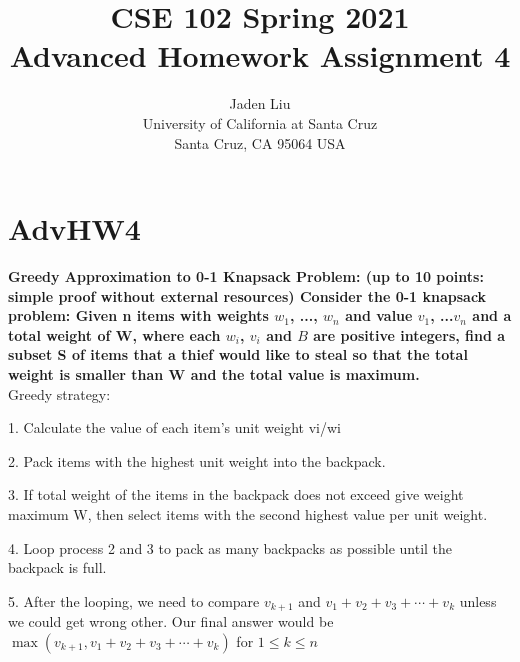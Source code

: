 \documentclass[12pt]{article}
\begin{document}
\title{ CSE 102 Spring 2021\\
	Advanced Homework Assignment 4}

\author{Jaden Liu \\ 
University of California at Santa Cruz\\
Santa Cruz, CA 95064 USA }

\maketitle


\section{AdvHW4} 

\textbf{Greedy Approximation to 0-1 Knapsack Problem: (up to 10 points: simple proof without external
	resources) Consider the 0-1 knapsack problem: Given n items with weights $w_1$, ..., $w_n$ and value $v_1$, ...$v_n$ and a total weight of W, where each $w_i$, $v_i$ and $B$ are positive integers, find a subset S of items that a thief would like to steal so that the total weight is smaller than W and the total value is maximum.}\\
Greedy strategy:

	1. Calculate the value of each item's unit weight vi/wi
	
	2. Pack items with the highest unit weight into the backpack.
	
	3. If total weight of the items in the backpack does not exceed give weight maximum W, then select items with the second highest value per unit weight. 
	
	4. Loop process 2 and 3 to pack as many backpacks as possible until the backpack is full.
	
	5. After the looping, we need to compare $v_{k+1}$ and $v_1+v_2+v_3+\cdots+v_k$ unless we could get wrong other. Our final answer would be $\max (v_{k+1},v_1+v_2+v_3+\cdots+v_k)$ for $1\le k\le n$
\end{document}

